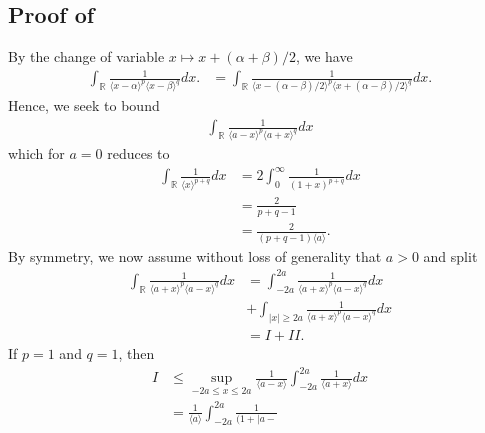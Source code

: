 \documentclass[12pt,reqno]{amsart}
\numberwithin{equation}{section}  %
\renewcommand{\cref}{\Cref}
\newcommand{\rr}{\mathbb{R}}
\begin{document}
\begin{appendices}
\subsection{Proof of \cref{lem:calc}}
%
By the change of variable $x \mapsto x + (\alpha + \beta)/2$, we have
%
%
\begin{equation*}
	\begin{split}
    \int_{\rr} \frac{1}{\langle x - \alpha \rangle^{p} \langle  x -
    \beta
    \rangle^{q}}d x.
    & = \int_{\rr} \frac{1}{ \langle x - (\alpha - \beta)/2  \rangle^{p}
    \langle  x + (\alpha - \beta)/2 \rangle^{q}} d x.
	\end{split}
\end{equation*}
%
%
Hence, we seek to bound
%
%
%
\begin{equation*}
\begin{split}
  \int_{\rr} \frac{1}{\langle a - x \rangle ^{p} \langle a + x \rangle
  ^{q}} d x
\end{split}
\end{equation*}
%
which for $a =0$ reduces to 
%
%
\begin{equation*}
\begin{split}
  \int_{\rr} \frac{1}{\langle x \rangle ^{p+q}} d x 
  & = 2 \int_{0}^{\infty} \frac{1}{(1 + x)^{p+q}} d x
  \\
  & = \frac{2}{p+q -1}
  \\
  & = \frac{2}{(p+q -1)\langle a \rangle }.
\end{split}
\end{equation*}
%
%
By symmetry, we now assume without loss of generality that $a > 0$ and split 
%
%
\begin{equation*}
\begin{split}
\int_{\rr} \frac{1}{\langle a + x \rangle ^{p} \langle a - x \rangle
  ^{q}} d x
  & = \int_{-2a}^{2a}
  \frac{1}{\langle a + x \rangle ^{p} \langle a - x \rangle
  ^{q}} d x
  \\
  & + \int_{| x | \ge 2a} 
\frac{1}{\langle a + x \rangle ^{p} \langle a - x \rangle
  ^{q}} d x
  \\
  & = I + II.
\end{split}
\end{equation*}
%
%
If $p=1$ and $q=1$, then 
%
%
\begin{equation*}
\begin{split}
  I
  & \le \sup_{-2a \le x \le 2a} \frac{1}{\langle a - x \rangle
  } \int_{-2a}^{2a} \frac{1}{\langle a + x \rangle } d x
  \\
  & = \frac{1}{\langle a \rangle } \int_{-2a}^{2a} \frac{1}{(1 + | a -
}
\end{split}
\end{equation*}
\end{appendices}
\end{document}
